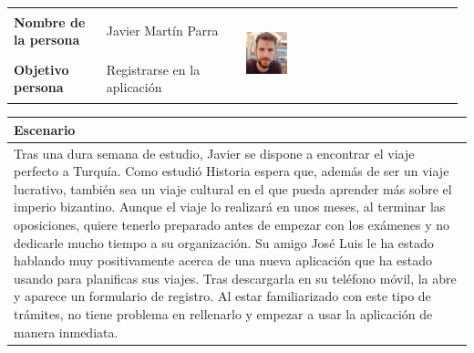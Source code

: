 \documentclass[11pt]{article}
\begin{document}
\begin{table}[H]
  \centering
  \begin{tabular}{p{0.2\linewidth}|p{0.3\linewidth}p{0.475\linewidth}}
    \toprule
    \textbf{Nombre de la persona} & Javier Martín Parra &\multirow{2}{*}{\begin{minipage}{1.\textwidth}\includegraphics[width=0.2\textwidth, height=25mm]{Javier}\end{minipage}}\\
    \textbf{Objetivo persona} & Registrarse en la aplicación & \\
    \bottomrule
  \end{tabular}

\begin{tabular}{p{1.028\linewidth}}
  \textbf{Escenario}\\
  \midrule
  
  Tras una dura semana de estudio, Javier se dispone a encontrar el viaje perfecto a Turquía. Como estudió Historia espera que, además de ser un viaje lucrativo, también sea un viaje cultural en el que pueda aprender más sobre el imperio bizantino. Aunque el viaje lo realizará en unos meses, al terminar las oposiciones, quiere tenerlo preparado antes de empezar con los exámenes y no dedicarle mucho tiempo a su organización. Su amigo José Luis le ha estado hablando muy positivamente acerca de una nueva aplicación que ha estado usando para planificas sus viajes. Tras descargarla en su teléfono móvil, la abre y aparece un formulario de registro. Al estar familiarizado con este tipo de trámites, no tiene problema en rellenarlo y empezar a usar la aplicación de manera inmediata. 
\end{tabular}
\end{table}
\end{document}

